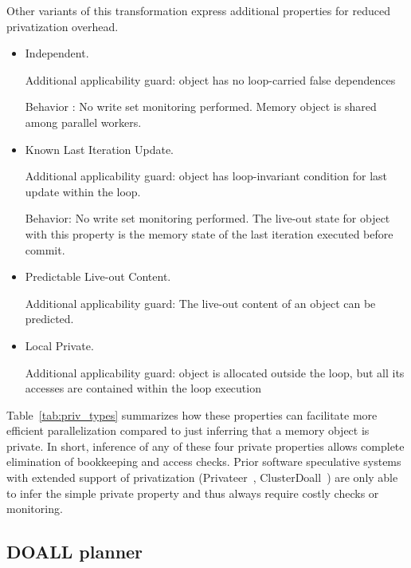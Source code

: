 Other variants of this transformation express additional properties for
reduced privatization overhead.
%
\begin{itemize}
%
\item Independent.

Additional applicability guard: object has no
loop-carried false dependences

Behavior : No write set monitoring performed. Memory object is shared among parallel workers.
%
%
\item Known Last Iteration Update.

Additional applicability guard:
object has loop-invariant condition for last update within the loop.

Behavior: No write set monitoring performed. The live-out state for
object with this property is the memory state of the last iteration
executed before commit.
%
%
\item Predictable Live-out Content.

Additional applicability guard:
The live-out content of an object can be predicted.
%
%
\item Local Private.

Additional applicability guard: object is
allocated outside the loop, but all its accesses are contained within
the loop execution
%
\end{itemize}

Table~\ref{tab:priv_types} summarizes how these properties can facilitate more
efficient parallelization compared to just inferring that a memory object is
private. In short, inference of any of these four private properties allows
complete elimination of bookkeeping and access checks. Prior software
speculative systems with extended support of privatization (Privateer~\cite{},
ClusterDoall~\cite{}) are only able to infer the simple private property and
thus always require costly checks or monitoring.





\subsection{DOALL planner}
\label{planner}


\lstset{basicstyle=\ttfamily, numbers=left, numberstyle=\tiny,
  stepnumber=1, numbersep=5pt}

